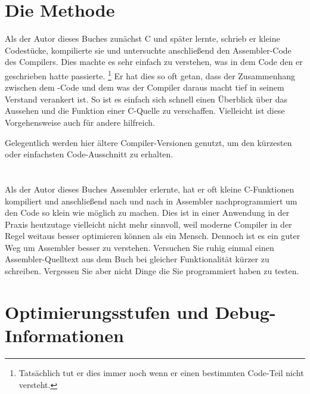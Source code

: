 \section{Die Methode}

Als der Autor dieses Buches zunächst C und später \Cpp lernte, schrieb er kleine Codestücke, kompilierte sie und
untersuchte anschließend den Assembler-Code des Compilers. Dies machte es sehr einfach zu verstehen, was in dem Code
den er geschrieben hatte passierte.
\footnote{Tatsächlich tut er dies immer noch wenn er einen bestimmten Code-Teil nicht versteht.} 
Er hat dies so oft getan, dass der Zusammenhang zwischen dem \CCpp-Code und dem was der Compiler daraus macht tief in
seinem Verstand verankert ist. %
So ist es einfach sich schnell einen Überblick über das Aussehen und die Funktion einer C-Quelle zu verschaffen. 
Vielleicht ist diese Vorgehensweise auch für andere hilfreich.


Gelegentlich werden hier ältere Compiler-Versionen genutzt, um den kürzesten oder einfachsten Code-Ausschnitt zu erhalten.

\section*{\Exercises}

Als der Autor dieses Buches Assembler erlernte, hat er oft kleine C-Funktionen kompiliert und anschließend nach und nach in
Assembler nachprogrammiert um den Code so klein wie möglich zu machen.
Dies ist in einer Anwendung in der Praxis heutzutage vielleicht nicht mehr sinnvoll, weil moderne Compiler in der Regel weitaus
besser optimieren können als ein Mensch. Dennoch ist es ein guter Weg um Assembler besser zu verstehen. Versuchen Sie ruhig
einmal einen Assembler-Quelltext aus dem Buch bei gleicher Funktionalität kürzer zu schreiben.
Vergessen Sie aber nicht Dinge die Sie programmiert haben zu testen.

\section*{Optimierungsstufen und Debug-Informationen}

